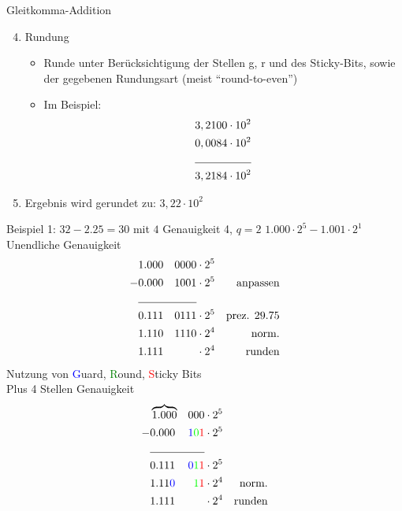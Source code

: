 \documentclass[12pt%
,xcolor=table
,aspectratio=169%
]{beamer}
\begin{document}
\begin{frame}{Gleitkomma-Addition}
\begin{enumerate} \setcounter{enumi}{3}
	\item Rundung
	\begin{itemize}
		\item Runde unter Berücksichtigung der Stellen g, r und des Sticky-Bits, sowie der gegebenen Rundungsart (meist \enquote{round-to-even})
		\item Im Beispiel:
		\begin{align*}
		3,2100 & \cdot 10^2 \\
		0,0084 & \cdot 10^2 \\ \cline{1-2}
		3,2184 & \cdot 10^2
		\end{align*}
	\end{itemize}
	\item Ergebnis wird gerundet zu: $3,22 \cdot 10^2$
\end{enumerate}
\end{frame}

\begin{frame}{Beispiel 1: $32 - 2.25 = 30$ mit $4$ Genauigkeit 4, $q = 2$}
  $ 1.000 \cdot 2^5 - 1.001 \cdot 2^1$\\
  Unendliche Genauigkeit
  \begin{align*}
  & 1.000 & 0000 & \cdot 2^5  & \\ 
 -& 0.000 & 1001 & \cdot 2^5 & \text{anpassen} \\ \cline{2-3}
  & 0.111 & 0111 & \cdot 2^5 & \text{prez. 29.75}\\
  & 1.110 & 1110 & \cdot 2^4 & \text{norm.} \\
  & 1.111  &    & \cdot 2^4 & \text{runden}\\
  \end{align*}
\endminipage \hfill
{}%
   Nutzung von \textcolor{blue}{G}uard, \textcolor{green}{R}ound, \textcolor{red}{S}ticky Bits\\
   Plus 4 Stellen Genauigkeit
  \begin{align*}
  & \overbrace{1.000} & 000 & \cdot 2^5  & \\ 
 -& 0.000 & \textcolor{blue}{1}\textcolor{green}{0}\textcolor{red}{1} & \cdot 2^5 &\\ \cline{2-3}
  & 0.111 & \textcolor{blue}{0}\textcolor{green}{1}\textcolor{red}{1} & \cdot 2^5 &\\
  & 1.11 \textcolor{blue}{0} & \textcolor{green}{1}\textcolor{red}{1} & \cdot 2^4 & \text{norm.} \\
  & 1.111 &     & \cdot 2^4 & \text{runden}\\
  \end{align*}
\endminipage
\end{frame}
\end{document}
